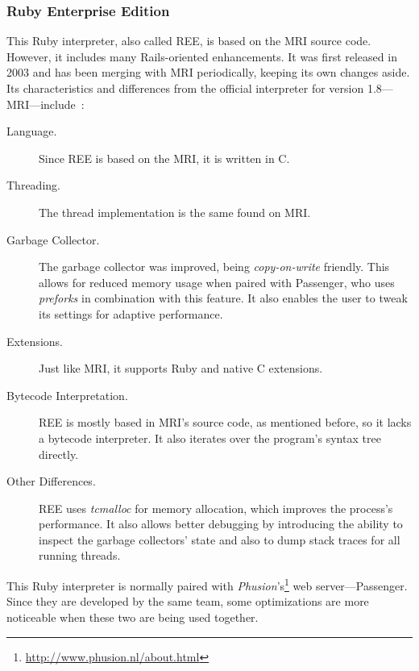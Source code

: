 \subsubsection{Ruby Enterprise Edition}
This Ruby interpreter, also called REE, is based on the MRI source code. However, it includes many Rails-oriented enhancements. It was first released in 2003 and has been merging with MRI periodically, keeping its own changes aside. Its characteristics and differences from the official interpreter for version 1.8---MRI---include~\cite{rubyenterpriseedition}:
\begin{description}
\item[Language.] Since REE is based on the MRI, it is written in C.
\item[Threading.] The thread implementation is the same found on MRI.
\item[Garbage Collector.]  The garbage collector was improved, being \textit{copy-on-write} friendly. This allows for reduced memory usage when paired with Passenger, who uses \textit{preforks} in combination with this feature.  It also enables the user to tweak its settings for adaptive performance.
\item[Extensions.]  Just like MRI, it supports Ruby and native C extensions. 
\item[Bytecode Interpretation.] REE is mostly based in MRI's source code, as mentioned before, so it lacks a bytecode interpreter. It also iterates over the program's syntax tree directly.
\item[Other Differences.] REE uses \textit{tcmalloc} for memory allocation, which improves the process's performance. It also allows better debugging by introducing the ability to inspect the garbage collectors' state and also to dump stack traces for all running threads.
 \end{description}
This Ruby interpreter is normally paired with \textit{Phusion}'s\footnote{\url{http://www.phusion.nl/about.html}} web server---Passenger. Since they are developed by the same team, some optimizations are more noticeable when these two are being used together.


